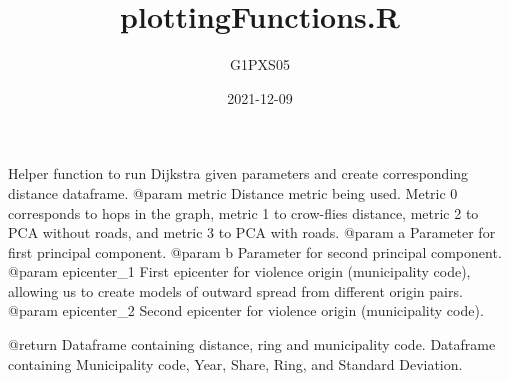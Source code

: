\documentclass[
]{article}
\title{plottingFunctions.R}
\author{G1PXS05}
\date{2021-12-09}
\begin{document}
\maketitle

Helper function to run Dijkstra given parameters and create
corresponding distance dataframe. @param metric Distance metric being
used. Metric 0 corresponds to hops in the graph, metric 1 to crow-flies
distance, metric 2 to PCA without roads, and metric 3 to PCA with roads.
@param a Parameter for first principal component. @param b Parameter for
second principal component. @param epicenter\_1 First epicenter for
violence origin (municipality code), allowing us to create models of
outward spread from different origin pairs. @param epicenter\_2 Second
epicenter for violence origin (municipality code).

@return Dataframe containing distance, ring and municipality code.
Dataframe containing Municipality code, Year, Share, Ring, and Standard
Deviation.

\end{document}
